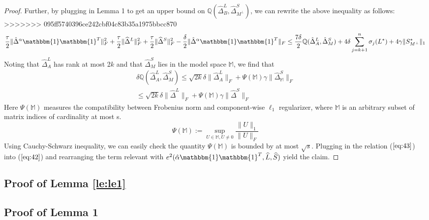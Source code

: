 \documentclass[AMS,STIX1COL]{WileyNJD-v2}
\begin{document}
\begin{proof}
Further, by plugging in Lemma 1 to get an upper bound on  $\mathbb{Q}(\widehat{\Delta}^L_{B},\widehat{\Delta}^S_{M^\perp})$, we can rewrite the above inequality as follows:
>>>>>>> 095ff5740396ce242cbf04c83b35a1975bbcc870
\begin{align}
    \frac{\tau}{2} \|\hat{\Delta}^{\alpha}\mathbbm{1}\mathbbm{1}^T\|_{F}^{2} + \frac{\tau}{2} \|\widehat{\Delta}^{L}\|_{F}^{2} + \frac{\tau}{2} \|\widehat{\Delta}^{S}\|_{F}^{2} -
    \frac{\delta}{2} \|\hat{\Delta}^{\alpha}\mathbbm{1}\mathbbm{1}^T\|_{F}
    \leq
    \frac{7\delta}{2}\mathbb{Q}(\hat{\Delta}^L_{A},\hat{\Delta}^S_{M}) + 4 \delta \sum_{j=k+1}^{n} \sigma_{j}(L^*) + 4\gamma \|S^*_{M^\perp}\|_{1}  \label{eq:42}
\end{align}
Noting that $\widehat{\Delta}^{L}_{A}$ has rank at most 2$k$ and that $\widehat{\Delta}^{S}_{M}$ lies in the model space $\mathbb{M}$, we find that
\begin{align}
    \nonumber
    \delta\mathbb{Q}(\widehat{\Delta}^L_{A},\widehat{\Delta}^S_{M})
    \leq \sqrt{2k}\delta\|\widehat{\Delta}^L_{A}\|_{F} + \Psi(\mathbb{M})\gamma\|\widehat{\Delta}^S_\mathbb{M}\|_{F}\\
    \leq \sqrt{2k}\delta\|\widehat{\Delta}^L\|_{F} + \Psi(\mathbb{M})\gamma\|\widehat{\Delta}^S\|_{F}  \label{eq:43}
\end{align}
Here $\Psi(\mathbb{M})$ measures the compatibility between Frobenius norm and component-wise $\ell_{1}$ regularizer, where $\mathbb{M}$ is an arbitrary subset of matrix indices of cardinality at most s.
\[
    \Psi(\mathbb{M}):=\sup\limits_{U\in\mathbb{M},U\neq0}\frac{\|U\|_{1}}{\|U\|_{F}}
\]
Using Cauchy-Schwarz inequality, we can easily check the quantity $\Psi(\mathbb{M})$ is bounded by at most $\sqrt{s}$. Plugging in the relation ($\ref{eq:43}$) into ($\ref{eq:42}$) and rearranging the term relevant with  $e^{2}(\hat{\alpha}\mathbbm{1}\mathbbm{1}^T,\widehat{L},\widehat{S})$ yield the claim.
\end{proof}


\subsection{Proof of Lemma \ref{le:le1}}
\subsection{Proof of Lemma 1}
\end{document}
